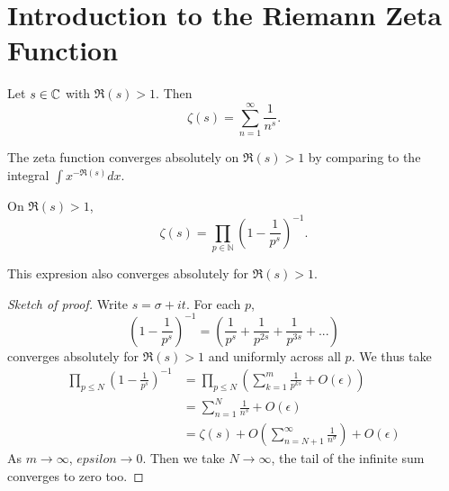 \section{Introduction to the Riemann Zeta Function}

\begin{definition}
	Let $s\in\mathbb{C}$ with $\Re(s)>1$. Then \begin{equation}
	\zeta(s)=\sum_{n=1}^{\infty}\frac{1}{n^s}.
	\end{equation}
\end{definition}
The zeta function converges absolutely on $\Re(s)>1$ by comparing to the integral $\int x^{-\Re(s)} dx$.
\begin{proposition}\label{eulerproduct}
	On $\Re(s)>1$, \begin{equation}
		\zeta(s) = \prod_{p\in\mathbb{N}}\left(1-\frac{1}{p^s}\right)^{-1}.	
	\end{equation}
\end{proposition}
\begin{remark}
	This expresion also converges absolutely for $\Re(s)>1$.
\end{remark}
\begin{proof}[Sketch of proof]
	Write $s=\sigma+it$. For each $p$,\[
		\left(1-\frac{1}{p^s}\right)^{-1} = \left(\frac{1}{p^s}+\frac{1}{p^{2s}}+\frac{1}{p^{3s}}+...\right)
	\]
	converges absolutely for $\Re(s)>1$ and uniformly across all $p$. We thus take \begin{align*}
		\prod_{p\leq N}\left(1-\frac{1}{p^s}\right)^{-1}  &= \prod_{p\leq N}\left(\sum_{k=1}^{m} \frac{1}{p^{ks}}+O(\epsilon)\right)\\
		&=\sum_{n=1}^{N}\frac{1}{n^s} + O(\epsilon)\\
		&=\zeta(s) + O(\sum_{n=N+1}^{\infty} \frac{1}{n^\sigma}) + O(\epsilon)
	\end{align*}
	As $m\to\infty$, $epsilon \to 0$. Then we take $N\to\infty$, the tail of the infinite sum converges to zero too.
\end{proof}

